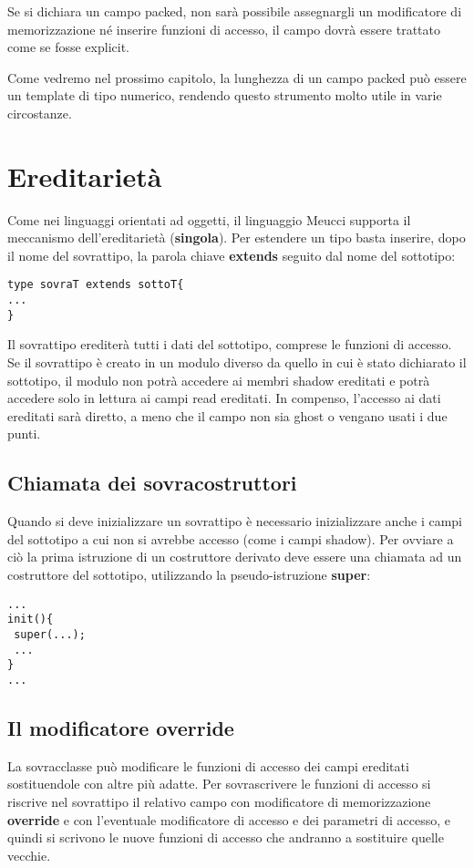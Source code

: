 \documentclass[10pt]{book}%
\newcommand{\e}{\`{e} }
\newcommand{\ac}[1]{\`{#1}}
\renewcommand{\emph}[1]{\textbf{#1}}
\newenvironment{codeenv}{
\begin{mdframed}[backgroundcolor=black!20,topline=false,leftline=false,rightline=false,bottomline=false]
}
{\end{mdframed}}
\begin{document}
Se si dichiara un campo packed, non sar\ac a possibile assegnargli un modificatore di memorizzazione n\'e inserire funzioni di accesso, il campo dovr\ac a essere trattato come se fosse explicit.

Come vedremo nel prossimo capitolo, la lunghezza di un campo packed pu\ac o essere un template di tipo numerico, rendendo questo strumento molto utile in varie circostanze.

\section{Ereditariet\ac a}
Come nei linguaggi orientati ad oggetti, il linguaggio Meucci supporta il meccanismo dell'ereditariet\ac a (\emph{singola}). Per estendere un tipo basta inserire, dopo il nome del sovrattipo, la parola chiave \emph{extends} seguito dal nome del sottotipo:
\begin{codeenv}
\begin{verbatim}
type sovraT extends sottoT{
...
}
\end{verbatim}
\end{codeenv}
Il sovrattipo erediter\ac a tutti i dati del sottotipo, comprese le funzioni di accesso. Se il sovrattipo \e creato in un modulo diverso da quello in cui \e stato dichiarato il sottotipo, il modulo non potr\ac a accedere ai membri shadow ereditati e potr\ac a accedere solo in lettura ai campi read ereditati. In compenso, l'accesso ai dati ereditati sar\ac a diretto, a meno che il campo non sia ghost o vengano usati i due punti.

\subsection{Chiamata dei sovracostruttori}
Quando si deve inizializzare un sovrattipo \e necessario inizializzare anche i campi del sottotipo a cui non si avrebbe accesso (come i campi shadow). Per ovviare a ci\ac o la prima istruzione di un costruttore derivato deve essere una chiamata ad un costruttore del sottotipo, utilizzando la pseudo-istruzione \emph{super}:
\begin{codeenv}
\begin{verbatim}
...
init(){
 super(...);
 ...
}
...
\end{verbatim}
\end{codeenv}

\subsection{Il modificatore override}
La sovracclasse pu\ac o modificare le funzioni di accesso dei campi ereditati sostituendole con altre pi\ac u adatte. Per sovrascrivere le funzioni di accesso si riscrive nel sovrattipo il relativo campo con modificatore di memorizzazione \emph{override} e con l'eventuale modificatore di accesso e dei parametri di accesso, e quindi si scrivono le nuove funzioni di accesso che andranno a sostituire quelle vecchie.
\end{document}

